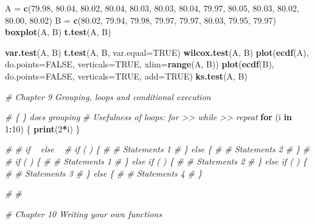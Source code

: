 \documentclass[11pt,]{krantz}
\makeatletter
\newenvironment{Shaded}{\begin{snugshade}}{\end{snugshade}}
\newcommand{\KeywordTok}[1]{\textcolor[rgb]{0.13,0.29,0.53}{\textbf{#1}}}
\newcommand{\DataTypeTok}[1]{\textcolor[rgb]{0.13,0.29,0.53}{#1}}
\newcommand{\DecValTok}[1]{\textcolor[rgb]{0.00,0.00,0.81}{#1}}
\newcommand{\FloatTok}[1]{\textcolor[rgb]{0.00,0.00,0.81}{#1}}
\newcommand{\StringTok}[1]{\textcolor[rgb]{0.31,0.60,0.02}{#1}}
\newcommand{\CommentTok}[1]{\textcolor[rgb]{0.56,0.35,0.01}{\textit{#1}}}
\newcommand{\OtherTok}[1]{\textcolor[rgb]{0.56,0.35,0.01}{#1}}
\newcommand{\ControlFlowTok}[1]{\textcolor[rgb]{0.13,0.29,0.53}{\textbf{#1}}}
\newcommand{\OperatorTok}[1]{\textcolor[rgb]{0.81,0.36,0.00}{\textbf{#1}}}
\newcommand{\NormalTok}[1]{#1}
\newenvironment{kframe}{%
\medskip{}
\setlength{\fboxsep}{.8em}
 \def\at@end@of@kframe{}%
 \ifinner\ifhmode%
  \def\at@end@of@kframe{\end{minipage}}%
  \begin{minipage}{\columnwidth}%
 \fi\fi%
 \def\FrameCommand##1{\hskip\@totalleftmargin \hskip-\fboxsep
 \colorbox{shadecolor}{##1}\hskip-\fboxsep
     \hskip-\linewidth \hskip-\@totalleftmargin \hskip\columnwidth}%
 \MakeFramed {\advance\hsize-\width
   \@totalleftmargin\z@ \linewidth\hsize
   \@setminipage}}%
 {\par\unskip\endMakeFramed%
 \at@end@of@kframe}
\renewenvironment{Shaded}{\begin{kframe}}{\end{kframe}}
\theoremstyle{definition}
\theoremstyle{definition}
\theoremstyle{remark}
\makeatother
\begin{document}
\begin{Shaded}
\begin{Highlighting}[]
\NormalTok{A =}\StringTok{ }\KeywordTok{c}\NormalTok{(}\FloatTok{79.98}\NormalTok{, }\FloatTok{80.04}\NormalTok{, }\FloatTok{80.02}\NormalTok{, }\FloatTok{80.04}\NormalTok{, }\FloatTok{80.03}\NormalTok{, }\FloatTok{80.03}\NormalTok{, }\FloatTok{80.04}\NormalTok{, }\FloatTok{79.97}\NormalTok{, }\FloatTok{80.05}\NormalTok{, }\FloatTok{80.03}\NormalTok{, }\FloatTok{80.02}\NormalTok{, }\FloatTok{80.00}\NormalTok{, }\FloatTok{80.02}\NormalTok{)}
\NormalTok{B =}\StringTok{ }\KeywordTok{c}\NormalTok{(}\FloatTok{80.02}\NormalTok{, }\FloatTok{79.94}\NormalTok{, }\FloatTok{79.98}\NormalTok{, }\FloatTok{79.97}\NormalTok{, }\FloatTok{79.97}\NormalTok{, }\FloatTok{80.03}\NormalTok{, }\FloatTok{79.95}\NormalTok{, }\FloatTok{79.97}\NormalTok{)}
\KeywordTok{boxplot}\NormalTok{(A, B)}
\KeywordTok{t.test}\NormalTok{(A, B)}

\KeywordTok{var.test}\NormalTok{(A, B)}
\KeywordTok{t.test}\NormalTok{(A, B, }\DataTypeTok{var.equal=}\OtherTok{TRUE}\NormalTok{)}
\KeywordTok{wilcox.test}\NormalTok{(A, B)}
\KeywordTok{plot}\NormalTok{(}\KeywordTok{ecdf}\NormalTok{(A), }\DataTypeTok{do.points=}\OtherTok{FALSE}\NormalTok{, }\DataTypeTok{verticals=}\OtherTok{TRUE}\NormalTok{, }\DataTypeTok{xlim=}\KeywordTok{range}\NormalTok{(A, B))}
\KeywordTok{plot}\NormalTok{(}\KeywordTok{ecdf}\NormalTok{(B), }\DataTypeTok{do.points=}\OtherTok{FALSE}\NormalTok{, }\DataTypeTok{verticals=}\OtherTok{TRUE}\NormalTok{, }\DataTypeTok{add=}\OtherTok{TRUE}\NormalTok{)}
\KeywordTok{ks.test}\NormalTok{(A, B)}

\CommentTok{# Chapter 9 Grouping, loops and conditional execution}

\CommentTok{# \{ \} does grouping}
\CommentTok{# Usefulness of loops: for >> while >> repeat}
\ControlFlowTok{for}\NormalTok{ (i }\ControlFlowTok{in} \DecValTok{1}\OperatorTok{:}\DecValTok{10}\NormalTok{) \{}
  \KeywordTok{print}\NormalTok{(}\DecValTok{2}\OperatorTok{*}\NormalTok{i)}
\NormalTok{\}}

\CommentTok{# # if ~ else ~}
\CommentTok{# if (   ) \{}
\CommentTok{# # Statements 1}
\CommentTok{# \} else \{}
\CommentTok{# # Statements 2}
\CommentTok{# \}}
\CommentTok{# }
\CommentTok{# if (   ) \{}
\CommentTok{# # Statements 1}
\CommentTok{# \} else if (   ) \{}
\CommentTok{# # Statements 2}
\CommentTok{# \} else if (   ) \{}
\CommentTok{# # Statements 3}
\CommentTok{# \} else \{}
\CommentTok{# # Statements 4  }
\CommentTok{# \}}

   
\CommentTok{#}
\CommentTok{#}

\CommentTok{# Chapter 10 Writing your own functions}


\end{Highlighting}
\end{Shaded}
\end{document}
